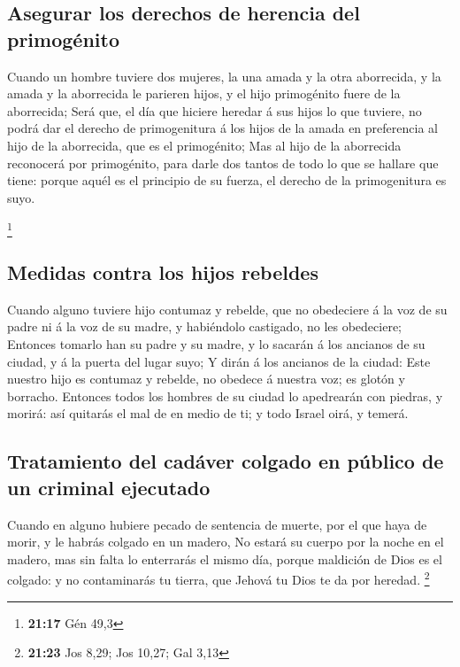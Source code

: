 \hypertarget{asegurar-los-derechos-de-herencia-del-primoguxe9nito}{%
\subsection{Asegurar los derechos de herencia del
primogénito}\label{asegurar-los-derechos-de-herencia-del-primoguxe9nito}}

 Cuando un hombre tuviere dos mujeres, la una amada y la
otra aborrecida, y la amada y la aborrecida le parieren hijos, y el hijo
primogénito fuere de la aborrecida;  Será que, el día que
hiciere heredar á sus hijos lo que tuviere, no podrá dar el derecho de
primogenitura á los hijos de la amada en preferencia al hijo de la
aborrecida, que es el primogénito;  Mas al hijo de la
aborrecida reconocerá por primogénito, para darle dos tantos de todo lo
que se hallare que tiene: porque aquél es el principio de su fuerza, el
derecho de la primogenitura es suyo.

\footnote{\textbf{21:17} Gén 49,3}

\hypertarget{medidas-contra-los-hijos-rebeldes}{%
\subsection{Medidas contra los hijos
rebeldes}\label{medidas-contra-los-hijos-rebeldes}}

 Cuando alguno tuviere hijo contumaz y rebelde, que no
obedeciere á la voz de su padre ni á la voz de su madre, y habiéndolo
castigado, no les obedeciere;  Entonces tomarlo han su
padre y su madre, y lo sacarán á los ancianos de su ciudad, y á la
puerta del lugar suyo;  Y dirán á los ancianos de la
ciudad: Este nuestro hijo es contumaz y rebelde, no obedece á nuestra
voz; es glotón y borracho.  Entonces todos los hombres de
su ciudad lo apedrearán con piedras, y morirá: así quitarás el mal de en
medio de ti; y todo Israel oirá, y temerá.

\hypertarget{tratamiento-del-caduxe1ver-colgado-en-puxfablico-de-un-criminal-ejecutado}{%
\subsection{Tratamiento del cadáver colgado en público de un criminal
ejecutado}\label{tratamiento-del-caduxe1ver-colgado-en-puxfablico-de-un-criminal-ejecutado}}

 Cuando en alguno hubiere pecado de sentencia de muerte,
por el que haya de morir, y le habrás colgado en un madero,
 No estará su cuerpo por la noche en el madero, mas sin
falta lo enterrarás el mismo día, porque maldición de Dios es el
colgado: y no contaminarás tu tierra, que Jehová tu Dios te da por
heredad. \footnote{\textbf{21:23} Jos 8,29; Jos 10,27; Gal 3,13}

